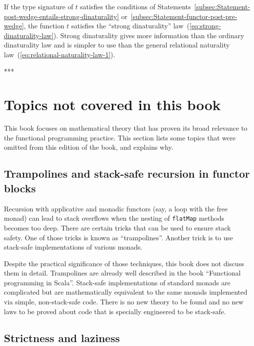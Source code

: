 If the type signature of $t$ satisfies the conditions of Statements~\ref{subsec:Statement-post-wedge-entails-strong-dinaturality}
or~\ref{subsec:Statement-functor-post-pre-wedge}, the function $t$
satisfies the \textsf{``}strong dinaturality\textsf{''} law~(\ref{eq:strong-dinaturality-law}).
Strong dinaturality gives more information than the ordinary dinaturality
law and is simpler to use than the general relational naturality law~(\ref{eq:relational-naturality-law-1}).

{*}{*}{*}

\setcounter{secnumdepth}{3}%
\begin{comment}
Restore the normal numbering of subsections and subsubsections
\end{comment}


\section{Topics not covered in this book}

This book focuses on mathematical theory that has proven its broad
relevance to the functional programming practice. This section lists
some topics that were omitted from this edition of the book, and explains
why.

\subsection{Trampolines and stack-safe recursion in functor blocks}

Recursion with applicative and monadic functors (say, a loop with
the free monad) can lead to stack overflows when the nesting of \lstinline!flatMap!
methods becomes too deep. There are certain tricks that can be used
to ensure stack safety. One of those tricks is known as \textsf{``}trampolines\textsf{''}.
Another trick is to use stack-safe implementations of various monads. 

Despite the practical significance of those techniques, this book
does not discuss them in detail. Trampolines are already well described
in the book \textsf{``}Functional programming in Scala\textsf{''}. Stack-safe implementations
of standard monads are complicated but are mathematically equivalent
to the same monads implemented via simple, non-stack-safe code. There
is no new theory to be found and no new laws to be proved about code
that is specially engineered to be stack-safe.

\subsection{Strictness and laziness}

